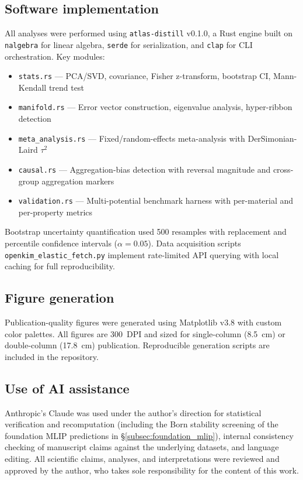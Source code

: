 \documentclass[twocolumn,10pt]{article}
\begin{document}
\subsection{Software implementation}

All analyses were performed using \texttt{atlas-distill} v0.1.0, a Rust engine built on \texttt{nalgebra} for linear algebra, \texttt{serde} for serialization, and \texttt{clap} for CLI orchestration. Key modules:
\begin{itemize}
\item \texttt{stats.rs} --- PCA/SVD, covariance, Fisher z-transform, bootstrap CI, Mann-Kendall trend test
\item \texttt{manifold.rs} --- Error vector construction, eigenvalue analysis, hyper-ribbon detection
\item \texttt{meta\_analysis.rs} --- Fixed/random-effects meta-analysis with DerSimonian-Laird $\tau^2$
\item \texttt{causal.rs} --- Aggregation-bias detection with reversal magnitude and cross-group aggregation markers
\item \texttt{validation.rs} --- Multi-potential benchmark harness with per-material and per-property metrics
\end{itemize}

Bootstrap uncertainty quantification used 500 resamples with replacement and percentile confidence intervals ($\alpha = 0.05$). Data acquisition scripts \texttt{openkim\_elastic\_fetch.py} implement rate-limited API querying with local caching for full reproducibility.

\subsection{Figure generation}

Publication-quality figures were generated using Matplotlib v3.8 with custom color palettes. All figures are 300~DPI and sized for single-column (8.5~cm) or double-column (17.8~cm) publication. Reproducible generation scripts are included in the repository.

\subsection{Use of AI assistance}

Anthropic's Claude was used under the author's direction for statistical verification and recomputation (including the Born stability screening of the foundation MLIP predictions in \S\ref{subsec:foundation_mlip}), internal consistency checking of manuscript claims against the underlying datasets, and language editing. All scientific claims, analyses, and interpretations were reviewed and approved by the author, who takes sole responsibility for the content of this work.
\end{document}
